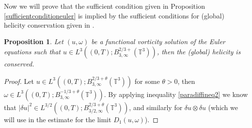 \documentclass[12pt,a4paper]{article}
\newtheorem{proposition}[theorem]{Proposition}
\theoremstyle{definition}
\theoremstyle{remark}
\numberwithin{equation}{section}
\begin{document}
Now we will prove that the sufficient condition given in Proposition \ref{sufficientconditioneuler} is implied by the sufficient conditions for (global) helicity conservation given in \cite{cheskidovconstantin,derosa}. 
\begin{proposition} \label{conservationbesov}
Let $(u, \omega)$ be a functional vorticity solution of the Euler equations such that $u \in L^3 ((0,T); B^{2/3+}_{3,\infty} (\mathbb{T}^3))$, then the (global) helicity is conserved.
\end{proposition}
\begin{proof}
Let $u \in L^3 ((0,T); B^{2/3+\theta}_{3,\infty} (\mathbb{T}^3))$ for some $\theta > 0$, then $\omega \in L^3 ((0,T); B^{-1/3+\theta}_{3,\infty} (\mathbb{T}^3))$. By applying inequality \eqref{paradiffineq2} we know that $\lvert \delta u \rvert^2 \in L^{3/2} ((0,T); B^{2/3+\theta}_{3/2,\infty} (\mathbb{T}^3))$, and similarly for $\delta u \otimes \delta u$ (which we will use in the estimate for the limit $D_1 (u,\omega)$). 


\end{proof}
\end{document}
